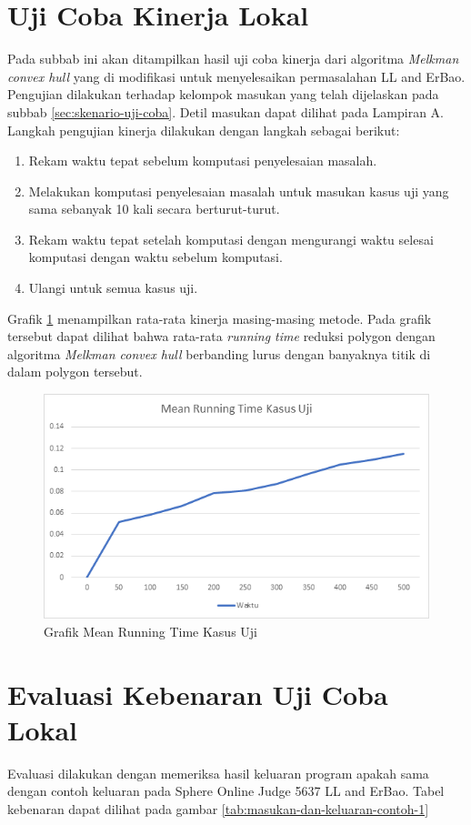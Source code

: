 \section{Uji Coba Kinerja Lokal}
Pada subbab ini akan ditampilkan hasil uji coba kinerja dari algoritma \textit{Melkman convex hull} yang di modifikasi untuk menyelesaikan permasalahan LL and ErBao. Pengujian dilakukan terhadap kelompok masukan yang telah dijelaskan pada subbab \ref{sec:skenario-uji-coba}. Detil masukan dapat dilihat pada Lampiran A. Langkah pengujian kinerja dilakukan dengan langkah sebagai berikut:
\begin{enumerate}
	\item Rekam waktu tepat sebelum komputasi penyelesaian masalah.
	\item Melakukan komputasi penyelesaian masalah untuk masukan kasus uji yang sama sebanyak 10 kali secara berturut-turut.
	\item Rekam waktu tepat setelah komputasi dengan mengurangi waktu selesai komputasi dengan waktu sebelum komputasi.
	\item Ulangi untuk semua kasus uji.
\end{enumerate}
\par Grafik \ref{fig:mean-running-time} menampilkan rata-rata kinerja masing-masing metode. Pada grafik tersebut dapat dilihat bahwa rata-rata \textit{running time} reduksi polygon dengan algoritma \textit{Melkman convex hull} berbanding lurus dengan banyaknya titik di dalam polygon tersebut.
\begin{figure}[!h]
	\Centering
	\includegraphics [width=\columnwidth]{bab5/img/mean-running-time}
	\caption {Grafik Mean Running Time Kasus Uji}
	\label {fig:mean-running-time}
\end{figure}

\section{Evaluasi Kebenaran Uji Coba Lokal}
Evaluasi dilakukan dengan memeriksa hasil keluaran program apakah sama dengan contoh keluaran pada Sphere Online Judge 5637 LL and ErBao. Tabel kebenaran dapat dilihat pada gambar \ref{tab:masukan-dan-keluaran-contoh-1}

